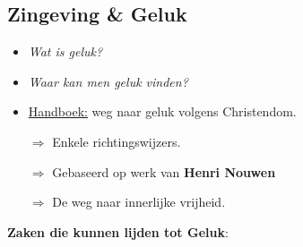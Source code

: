 \subsection*{Zingeving \& Geluk}
\begin{itemize}
	\item \textit{Wat is geluk?}
	\item \textit{Waar kan men geluk vinden?}
	\item \underline{Handboek:} weg naar geluk volgens Christendom.
	\item[$\Rightarrow$] Enkele richtingswijzers.
	\item[$\Rightarrow$] Gebaseerd op werk van \textbf{Henri Nouwen}
	\item[$\Rightarrow$] De weg naar innerlijke vrijheid.
\end{itemize}
\textbf{Zaken die kunnen lijden tot Geluk}:
